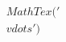 \documentclass[preview]{standalone}
\begin{document}
\begin{align*}
MathTex('\\vdots')
\end{align*}
\end{document}
